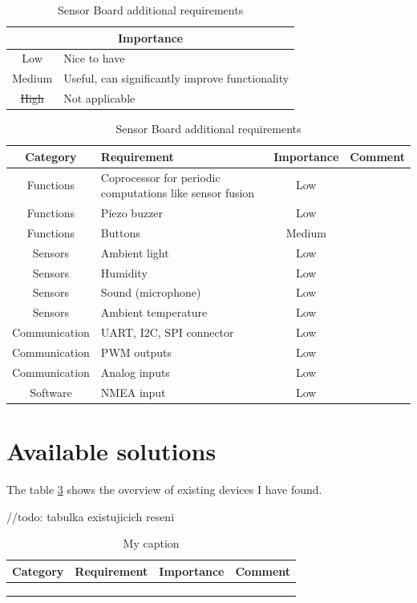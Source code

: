 \begin{table}[]
\centering
\caption{Sensor Board additional requirements}
\label{tab:additionalReq}
\begin{tabular}{|c|p{10cm}|}
	\hline
	\multicolumn{2}{|c|}{Importance} \\ \hline \hline
	Low	& Nice to have \\ \hline
	Medium & Useful, can significantly improve functionality \\ \hline
	\st{High} & Not applicable \\ \hline
\end{tabular}
\newline
\vspace{1cm}
\newline
\begin{tabular}{|c|p{5cm}|c|l|}
\hline
Category & Requirement & Importance & Comment \\ \hline
Functions & Coprocessor for periodic computations like sensor fusion & Low &  \\ \hline
Functions & Piezo buzzer & Low &  \\ \hline
Functions & Buttons & Medium &  \\ \hline

Sensors & Ambient light & Low &  \\ \hline
Sensors & Humidity & Low &  \\ \hline
Sensors & Sound (microphone) & Low &  \\ \hline
Sensors & Ambient temperature & Low &  \\ \hline

Communication & UART, I2C, SPI connector & Low &  \\ \hline
Communication & PWM outputs & Low &  \\ \hline
Communication & Analog inputs & Low &  \\ \hline

Software & NMEA input & Low &  \\ \hline
\end{tabular}
\end{table}

\section{Available solutions}
\label{HWavailableSolutions}
The table \ref{tab:availableSolutions} shows the overview of existing devices I have found.

//todo: tabulka existujicich reseni
\begin{table}[]
\centering
\caption{My caption}
\label{tab:availableSolutions}
\begin{tabular}{|l|l|l|l|}
\hline
Category & Requirement & Importance & Comment \\ \hline
         &             &            &         \\ \hline
         &             &            &         \\ \hline
         &             &            &         \\ \hline
\end{tabular}
\end{table}

